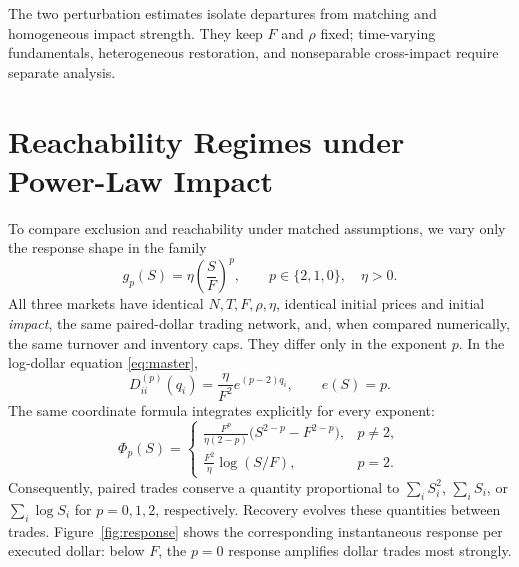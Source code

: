 \documentclass[review,hidelinks,onefignum,onetabnum]{siamonline250211}
\begin{document}
The two perturbation estimates isolate departures from matching
and homogeneous impact strength. They keep $F$ and $\rho$ fixed;
time-varying fundamentals, heterogeneous restoration, and
nonseparable cross-impact require separate analysis.

\section{Reachability Regimes under Power-Law Impact}\label{sec:regimes}
To compare exclusion and reachability under matched assumptions, we vary only the response shape in the family
\begin{equation}\label{eq:power}
 g_p(S)=\eta\left(\frac SF\right)^p,\qquad p\in\{2,1,0\},\quad \eta>0.
\end{equation}
All three markets have identical $N,T,F,\rho,\eta$, identical initial prices and initial \emph{impact}, the same paired-dollar trading network, and, when compared numerically, the same turnover and inventory caps. They differ only in the exponent $p$. In the log-dollar equation \eqref{eq:master},
\begin{equation}\label{eq:powerd}
 D_{ii}^{(p)}(q_i)=\frac\eta{F^2}e^{(p-2)q_i},\qquad e(S)=p.
\end{equation}
The same coordinate formula integrates explicitly for every exponent:
\[
\Phi_p(S)=\begin{cases}
\displaystyle \frac{F^p}{\eta(2-p)}\big(S^{2-p}-F^{2-p}\big),&p\ne2,\\[4pt]
\displaystyle \frac{F^2}{\eta}\log(S/F),&p=2.
\end{cases}
\]
Consequently, paired trades conserve a quantity proportional to $\sum_iS_i^2$, $\sum_iS_i$, or $\sum_i\log S_i$ for $p=0,1,2$, respectively. Recovery evolves these quantities between trades. Figure~\ref{fig:response} shows the corresponding instantaneous response per executed dollar: below $F$, the $p=0$ response amplifies dollar trades most strongly.
\end{document}
